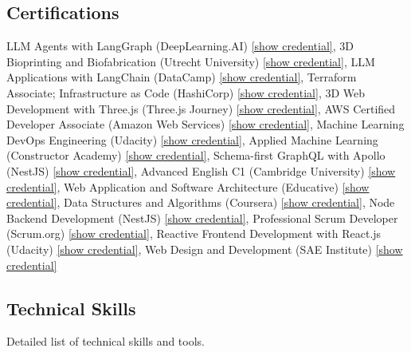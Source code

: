 \subsection{Certifications}
LLM Agents with LangGraph (DeepLearning.AI) \href{https://learn.deeplearning.ai/accomplishments/e3a1bd46-a13d-4b12-bd64-9e9aa27492a4?usp=sharing}{[show credential]}, 3D Bioprinting and Biofabrication (Utrecht University) \href{https://drive.google.com/file/d/1BOVyL7V7p27YgBe0bVIeDJ7hii_pP0RA/view}{[show credential]}, LLM Applications with LangChain (DataCamp) \href{https://www.datacamp.com/completed/statement-of-accomplishment/course/befaab3fb1a5c418ffacf6a7b8cba3a1bc606e88}{[show credential]}, Terraform Associate; Infrastructure as Code (HashiCorp) \href{https://www.credly.com/badges/0afd095d-588c-4bc0-9a52-319b3697f0a2/public_url}{[show credential]}, 3D Web Development with Three.js (Three.js Journey) \href{https://threejs-journey.com/certificate/view/5220}{[show credential]}, AWS Certified Developer Associate (Amazon Web Services) \href{https://www.credly.com/badges/f27b9b9f-14a4-43ed-ad43-c5d7b6f04db4/public_url}{[show credential]}, Machine Learning DevOps Engineering (Udacity) \href{https://www.udacity.com/certificate/DYMYJTWL}{[show credential]}, Applied Machine Learning (Constructor Academy) \href{https://www.credential.net/48d5f050-9a8a-4f10-befe-b3bc0d4a3512#acc.yjHCrpTh}{[show credential]}, Schema-first GraphQL with Apollo (NestJS) \href{https://drive.google.com/file/d/1ljUuPSulyj_hucWZ4um2VqNenMZC1nv7/edit}{[show credential]}, Advanced English C1 (Cambridge University) \href{https://www.cambridgeenglish.org/why-choose-us/higher-education-institutions/how-to-verify-results-online/}{[show credential]}, Web Application and Software Architecture (Educative) \href{https://www.educative.io/verify-certificate/02Gkvk3prQ1uY6onwD9GZJcrppxJYzpz5TP}{[show credential]}, Data Structures and Algorithms (Coursera) \href{https://www.coursera.org/account/accomplishments/specialization/RZUJ7KWDEBW6}{[show credential]}, Node Backend Development (NestJS) \href{https://drive.google.com/file/d/1itwrLOecUSXF7zhrW39CvpVp-REhvm3K/edit}{[show credential]}, Professional Scrum Developer (Scrum.org) \href{https://www.scrum.org/certificates/648504}{[show credential]}, Reactive Frontend Development with React.js (Udacity) \href{https://www.udacity.com/certificate/SGCJCENH}{[show credential]}, Web Design and Development (SAE Institute) \href{https://drive.google.com/file/d/13w0NuAkuPClj7sk8908c6fvGiVCxEqgh/edit}{[show credential]}

\subsection{Technical Skills}
Detailed list of technical skills and tools.

